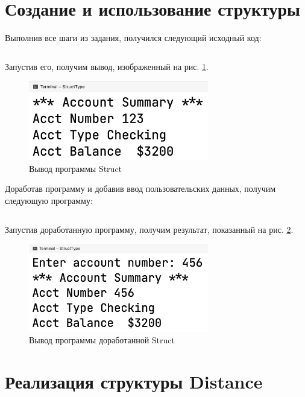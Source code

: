 \documentclass[a4paper,14pt]{extarticle}
\numberwithin{figure}{section}
\begin{document}
\section{Создание и использование структуры}

Выполнив все шаги из задания, получился следующий исходный код:

\inputminted{csharp}{../StructType/StructType/Struct.cs}

Запустив его, получим вывод, изображенный на рис. \ref{fig:task-2-1}.

\begin{figure}[H]
    \centering
    \includegraphics[width=0.7\textwidth]{images/task-2-1.png}
    \caption{Вывод программы Struct}
    \label{fig:task-2-1}
\end{figure}

Доработав программу и добавив ввод пользовательских данных, получим следующую программу:

\inputminted{csharp}{../StructType/StructType/Struct1.cs}

Запустив доработанную программу, получим результат, показанный на рис. \ref{fig:task-2-2}.

\begin{figure}[H]
    \centering
    \includegraphics[width=0.7\textwidth]{images/task-2-2.png}
    \caption{Вывод программы доработанной Struct}
    \label{fig:task-2-2}
\end{figure}

\section{Реализация структуры Distance}
\end{document}
